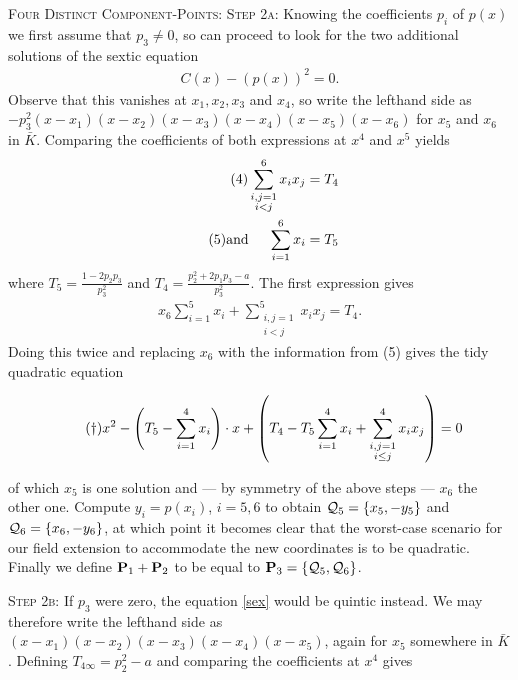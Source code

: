 \documentclass[english,11pt,a4paper]{article}
\begin{document}
\begin{case} {\scshape Four Distinct Component-Points:}
	{\scshape Step 2a:} Knowing the coefficients $p_i$ of $p(x)$ we first assume that $p_3 \neq 0$, so can proceed to look for the two additional solutions of the sextic equation
	\begin{align*}
		\tag{$\ast$} \label{sex} C(x)-\left(p(x)\right)^2 = 0.
	\end{align*}
	Observe that this vanishes at $x_1, x_2, x_3$ and $x_4$, so write the lefthand side as $-p_3^2(x-x_1)(x-x_2)(x-x_3)(x-x_4)(x-x_5)(x-x_6)$ for $x_5$ and $x_6$ in $\bar K$. Comparing the coefficients of both expressions at $x^4$ and $x^5$ yields
	\begin{align*}
		\label{four} \tag{4} \sum_{\substack{i,j=1\\i<j}}^6 x_i x_j &= T_4\\
		\tag{5} \text{and\hspace{5mm}} \sum_{i=1}^6 x_i &= T_5\\
	\end{align*}
	where $T_5 = \frac{1-2 p_2 p_3}{p_3^2}$ and $T_4 = \frac{p_2^2+2 p_1 p_3-a}{p_3^2}$.
	The first expression gives
	\begin{align*}
		x_6 \sum_{i=1}^5 x_i + \sum_{\substack{i,j=1\\i<j}}^5 x_i x_j = T_4.
	\end{align*}
	Doing this twice and replacing $x_6$ with the information from (5) gives the tidy quadratic equation

	\vspace{-3mm}
	\fline
	\begin{align*}
		\tag{$\dag$} \label{dagger} x^2 - \left(T_5 - \sumfo \right) \cdot x+ \left(T_4 - T_5 \sumfo + \sum_{\substack{i,j=1\\i\leq j}}^4 x_i x_j \right) = 0
	\end{align*}
	\fline

	of which $x_5$ is one solution and --- by symmetry of the above steps --- $x_6$ the other one. Compute $y_i=p(x_i)$, $i=5,6$ to obtain $\q_5 = \{ x_5, -y_5 \}$ and $\q_6 = \{ x_6, -y_6 \}$, at which point it becomes clear that the worst-case scenario for our field extension to accommodate the new coordinates is to be quadratic. Finally we define $\P_1 + \P_2$ to be equal to $\P_3 = \{ \q_5, \q_6 \}$.

	{\scshape Step 2b:} If $p_3$ were zero, the equation \eqref{sex} would be quintic instead. We may therefore write the lefthand side as $(x-x_1)(x-x_2)(x-x_3)(x-x_4)(x-x_5)$, again for $x_5$ somewhere in $\bar K$. Defining $T_{4\infty}=p_2^2 - a$ and comparing the coefficients at $x^4$ gives


\end{case}
\end{document}
